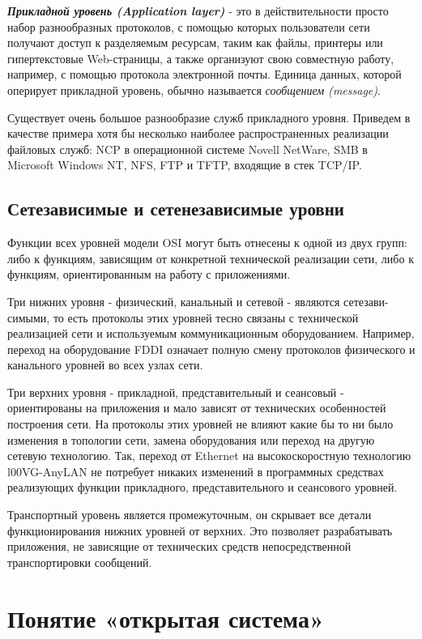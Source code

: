 \textbf{\textit{Прикладной уровень (Application layer)}} - это в действительности просто набор разнообразных протоколов, с помощью которых пользователи сети получают доступ к разделяемым ресурсам, таким как файлы, принтеры или гипертекстовые Web-страницы, а также организуют свою совместную работу, например, с помощью протокола электронной почты.
Единица данных, которой оперирует прикладной уровень, обычно называется \emph{сообщением (message)}.

Существует очень большое разнообразие служб прикладного уровня.
Приведем в качестве примера хотя бы несколько наиболее распространенных реализации файловых служб: NCP в операционной системе Novell NetWare, SMB в Microsoft Windows NT, NFS, FTP и TFTP, входящие в стек TCP/IP.

\subsection{Сетезависимые и сетенезависимые уровни}

Функции всех уровней модели OSI могут быть отнесены к одной из двух групп: либо к функциям, зависящим от конкретной технической реализации сети, либо к функциям, ориентированным на работу с приложениями.

Три нижних уровня - физический, канальный и сетевой - являются сетезави-симыми, то есть протоколы этих уровней тесно связаны с технической реализацией сети и используемым коммуникационным оборудованием.
Например, переход на оборудование FDDI означает полную смену протоколов физического и канального уровней во всех узлах сети.

Три верхних уровня - прикладной, представительный и сеансовый - ориентированы на приложения и мало зависят от технических особенностей построения сети.
На протоколы этих уровней не влияют какие бы то ни было изменения в топологии сети, замена оборудования или переход на другую сетевую технологию.
Так, переход от Ethernet на высокоскоростную технологию l00VG-AnyLAN не потребует никаких изменений в программных средствах реализующих функции прикладного, представительного и сеансового уровней.

Транспортный уровень является промежуточным, он скрывает все детали функционирования нижних уровней от верхних.
Это позволяет разрабатывать приложения, не зависящие от технических средств непосредственной транспортировки сообщений.

\section{Понятие «открытая система»}

